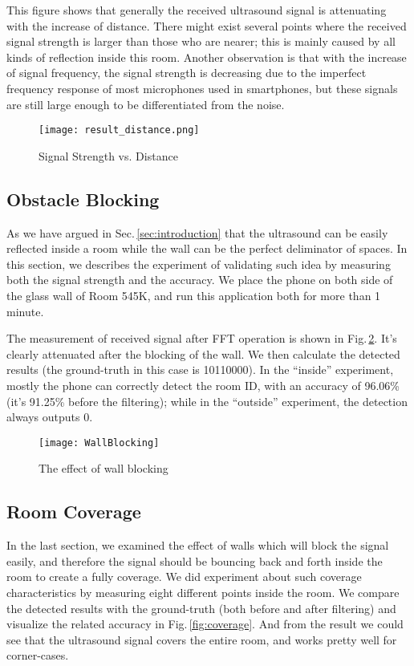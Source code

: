 This figure shows that generally the received ultrasound signal is attenuating with the increase of distance. There might exist several points where the received signal strength is larger than those who are nearer; this is mainly caused by all kinds of reflection inside this room. Another observation is that with the increase of signal frequency, the signal strength is decreasing due to the imperfect frequency response of most microphones used in smartphones, but these signals are still large enough to be differentiated  from the noise.

\begin{figure}
  \centering
  \texttt{[image: result\_distance.png]}
  \caption{Signal Strength vs. Distance}
  \vspace{-0.3cm}
  \label{fig:strength}
\end{figure}

\subsection{Obstacle Blocking}
\label{sec:obstacle-blocking}
As we have argued in Sec.\,\ref{sec:introduction} that the ultrasound can be easily reflected inside a room while the wall can be the perfect deliminator of spaces. In this section, we describes the experiment of validating such idea by measuring both the signal strength and the accuracy. We place the phone on both side of the glass wall of Room 545K, and run this application both for more than 1 minute.

The measurement of received signal after FFT operation is shown in Fig.\,\ref{fig:wallblock}. It's clearly attenuated after the blocking of the wall. We then calculate the detected results (the ground-truth in this case is 10110000). In the ``inside'' experiment, mostly the phone can correctly detect the room ID, with an accuracy of 96.06\% (it's 91.25\% before the filtering); while in the ``outside'' experiment, the detection always outputs 0.

\begin{figure}
  \centering
  \texttt{[image: WallBlocking]}
  \vspace{-0.3cm}
  \caption{The effect of wall blocking}
  \label{fig:wallblock}
\end{figure}

\subsection{Room Coverage}
\label{sec:room-coverage}
In the last section, we examined the effect of walls which will block the signal easily, and therefore the signal should be bouncing back and forth inside the room to create a fully coverage. We did experiment about such coverage characteristics by measuring eight different points inside the room. We compare the detected results with the ground-truth (both before and after filtering) and visualize the related accuracy in Fig.\,\ref{fig:coverage}. And from the result we could see that the ultrasound signal covers the entire room, and works pretty well for corner-cases. 

